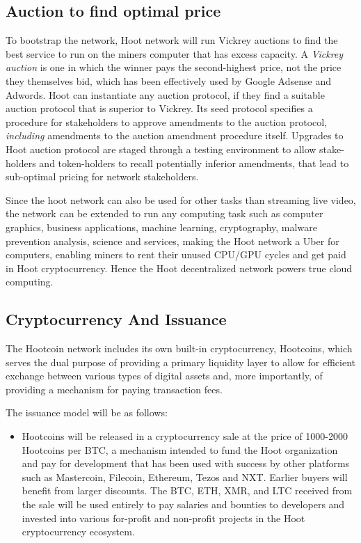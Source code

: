 \documentclass{article}
\begin{document}
\subsection{Auction to find optimal price}
To bootstrap the network, Hoot network will run Vickrey auctions to find the best service to run on the miners computer that has excess capacity. A \emph{Vickrey auction} is one in which the winner pays the second-highest price, not the price they themselves bid, which has been effectively used by Google Adsense and Adwords.
Hoot can instantiate any auction protocol, if they find a suitable auction protocol that is superior to Vickrey. Its seed protocol specifies a procedure for stakeholders to approve amendments to the auction protocol,
\emph{including} amendments to the auction amendment procedure
itself. Upgrades to Hoot auction protocol are staged through a testing
environment to allow stake-holders and token-holders to recall potentially inferior
amendments, that lead to sub-optimal pricing for network
stakeholders. 

Since the hoot network can also be used for other tasks than streaming live video, the network can be extended to run any computing task such as computer graphics, business applications, machine learning, cryptography, malware prevention analysis, science and services, making the Hoot network a Uber for computers, enabling miners to rent their unused CPU/GPU cycles and get paid in Hoot cryptocurrency. Hence the Hoot decentralized network powers true cloud computing.

\subsection{Cryptocurrency And Issuance}

The Hootcoin network includes its own built-in cryptocurrency, Hootcoins, which serves the dual purpose of providing a primary liquidity layer to allow for efficient exchange between various types of digital assets and, more importantly, of providing a mechanism for paying transaction fees.

The issuance model will be as follows:

\begin{itemize}

\item Hootcoins will be released in a cryptocurrency sale at the price of 1000-2000 Hootcoins per BTC, a mechanism intended to fund the Hoot organization and pay for development that has been used with success by other platforms such as Mastercoin, Filecoin, Ethereum, Tezos and NXT. Earlier buyers will benefit from larger discounts. The BTC, ETH, XMR, and LTC received from the sale will be used entirely to pay salaries and bounties to developers and invested into various for-profit and non-profit projects in the Hoot cryptocurrency ecosystem.

\end{itemize}
\end{document}

